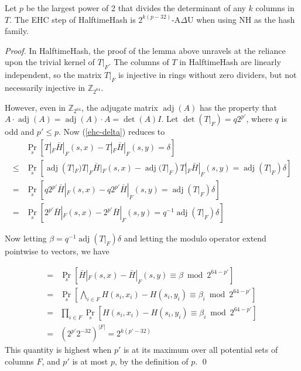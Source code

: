 \documentclass{llncs}
\DeclareMathOperator{\adj}{adj}
\newcommand{\ints}{\mathbb{Z}}
\begin{document}
\begin{theorem}
  Let $p$ be the largest power of 2 that divides the determinant of any $k$ columns in $T$.
  The EHC step of HalftimeHash is $2^{k(p-32)}$-A$\Delta$U when using NH as the hash family.
\end{theorem}

\begin{proof}
  In HalftimeHash, the proof of the lemma above unravels at the reliance upon the trivial kernel of $T|_F$.
  The columns of $T$ in HalftimeHash are linearly independent, so the matrix $T|_F$ is injective in rings without zero dividers, but not necessarily injective in $\ints_{2^{64}}$.

  However, even in $\ints_{2^{64}}$, the adjugate matrix $\adj(A)$ has the property that $A \cdot \adj(A) = \adj(A) \cdot A = \det(A) I$.
  Let $\det(T|_F) = q2^{p'}$, where $q$ is odd and $p' \le p$.
  Now (\ref{ehc-delta}) reduces to
  \[
  \begin{array}{rl}
    &   \Pr_s[T|_F \bar{H}|_F(s,x) - T|_F \bar{H}|_F(s,y) = \delta]\\
    \leq &  \Pr_s[\adj(T|_F) T|_F \bar{H}|_F(s,x) - \adj(T|_F) T|_F \bar{H}|_F(s,y) = \adj(T|_F) \delta] \\
    = &  \Pr_s[q2^{p'}\bar{H}|_F(s,x) - q2^{p'}\bar{H}|_F(s,y) = \adj(T|_F) \delta] \\
    = &  \Pr_s[2^{p'}\bar{H}|_F(s,x) - 2^{p'}\bar{H}|_F(s,y) = q^{-1} \adj(T|_F) \delta]
  \end{array}
  \]

  Now letting $\beta = q^{-1} \adj(T|_F) \delta$ and letting the modulo operator extend pointwise to vectors, we have

  \[
  \begin{array}{rl}
    = &  \Pr_s[\bar{H}|_F(s,x) - \bar{H}|_F(s,y) \equiv \beta \bmod 2^{64-p'}] \\
    = &  \Pr_s\left[\bigwedge_{i \in F} H(s_i,x_i) - H(s_i,y_i) \equiv \beta_i \bmod 2^{64-p'}\right] \\
    = &  \prod_{i \in F} \Pr_s\left[ H(s_i,x_i) - H(s_i,y_i) \equiv \beta_i \bmod 2^{64-p'}\right] \\
    = & \left(2^{p'} 2^{-32}\right)^{|F|} = 2^{k(p'-32)}
  \end{array}
  \]
  This quantity is highest when $p'$ is at its maximum over all potential sets of columns $F$, and $p'$ is at most $p$, by the definition of $p$.
  \qed
\end{proof}
\end{document}

